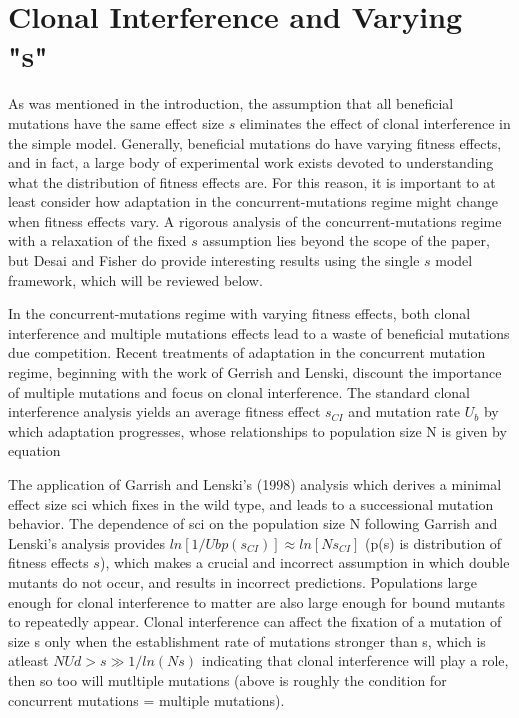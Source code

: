 \documentclass[12pt, one column]{article}
\begin{document}
\section*{Clonal Interference and Varying "s"}
As was mentioned in the introduction, the assumption that all beneficial mutations have the same effect size $s$ eliminates the effect of clonal interference in the simple model.  Generally, beneficial mutations do have varying fitness effects, and in fact, a large body of experimental work exists devoted to understanding what the distribution of fitness effects are.  For this reason, it is important to at least consider how adaptation in the concurrent-mutations regime might change when fitness effects vary.  A rigorous analysis of the concurrent-mutations regime with a relaxation of the fixed $s$ assumption lies beyond the scope of the paper, but Desai and Fisher do provide interesting results using the single $s$ model framework, which will be reviewed below.

In the concurrent-mutations regime with varying fitness effects, both clonal interference and multiple mutations effects lead to a waste of beneficial mutations due competition.  Recent treatments of adaptation in the concurrent mutation regime, beginning with the work of Gerrish and Lenski, discount the importance of multiple mutations and focus on clonal interference.  The standard clonal interference analysis yields an average fitness effect $s_{CI}$ and mutation rate $U_b$ by which adaptation progresses, whose relationships to population size N is given by equation   

The application of Garrish and Lenski's (1998) analysis which derives a minimal effect size sci which fixes in the wild type, and leads to a successional mutation behavior.
The dependence of sci on the population size N following Garrish and Lenski's analysis provides $ln[1/Ub p(s_{CI})] \approx ln[N s_{CI}]$ (p(s) is distribution of fitness effects $s$), which makes a crucial and incorrect assumption in which double mutants do not occur, and results in incorrect predictions.
Populations large enough for clonal interference to matter are also large enough for bound mutants to repeatedly appear.  Clonal interference can affect the fixation of a mutation of size s only when the establishment rate of  mutations stronger than s, which is atleast $NUd>s \gg 1/ln(Ns)$ indicating that clonal interference will play a role, then so too will mutltiple mutations (above is roughly the condition for concurrent mutations = multiple mutations). 
\end{document}
